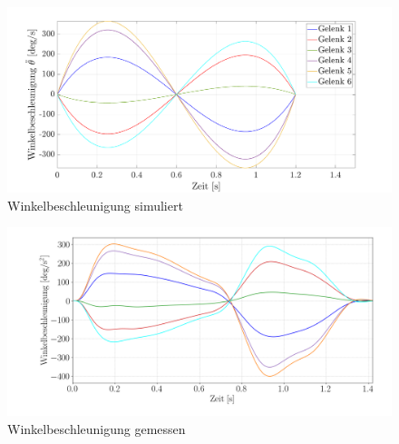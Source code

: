 %
\newpage
\begin{figure}[]
	\centering
	\includegraphics[width=1\linewidth]{images/accmat}
	\caption{Winkelbeschleunigung  simuliert}
	\label{fig:winkelbeschleunigung}
\end{figure}
%
\begin{figure}[]
	\centering
	\includegraphics[width=1\linewidth]{images/acc}
	\caption{Winkelbeschleunigung  gemessen}
	\label{fig:winkelbeschleunigung_py}
\end{figure}
